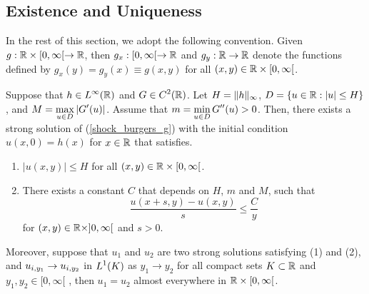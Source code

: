 \subsection{Existence and Uniqueness}

In the rest of this section, we adopt the following convention.
Given $g:\mathbb{R} \times [0,\infty[ \to \mathbb{R}$, then $g_x:[0,\infty[ \to \mathbb{R}$
and $g_y:\mathbb{R} \to \mathbb{R}$ denote the functions defined by
$g_x(y) = g_y(x) \equiv g(x,y)$ for all $(x,y) \in \mathbb{R}\times [0,\infty[$.

\begin{theorem} \label{Shock_EUth}
Suppose that $\displaystyle h \in L^\infty(\mathbb{R})$ and
$\displaystyle G \in C^2(\mathbb{R})$.
Let $\displaystyle H = \|h\|_\infty$,  $D = \{ u \in \mathbb{R} : |u| \leq H\}$, and
$\displaystyle M = \max_{u \in D} |G'(u)|$.  Assume that
$\displaystyle m = \min_{u \in D} G''(u) > 0$.  Then, there exists a
strong solution of (\ref{shock_burgers_g}) with the initial condition
$u(x,0) = h(x)$ for $x \in \mathbb{R}$ that satisfies.
\begin{enumerate}
\item $|u(x,y)|\leq H$ for all $(x,y) \in \mathbb{R} \times [0,\infty[$.
\item There exists a constant $C$ that depends on $H$, $m$ and $M$,
such that
\begin{equation} \label{entropy2}
\frac{u(x+s,y)-u(x,y)}{s} \leq \frac{C}{y}
\end{equation}
for $(x,y) \in \mathbb{R} \times ]0,\infty[$ and $s>0$.
\end{enumerate}

Moreover, suppose that $u_1$ and $u_2$ are two strong solutions
satisfying (1) and (2), and $\displaystyle u_{i,y_1} \to u_{i,y_2}$ in
$\displaystyle L^1(K)$ as $y_1 \to y_2$ for all compact sets
$K \subset \mathbb{R}$ and $y_1,y_2 \in [0,\infty[$ \footnotemark,
then $u_1 = u_2$ almost everywhere in $\mathbb{R}\times [0,\infty[$.
\end{theorem}


